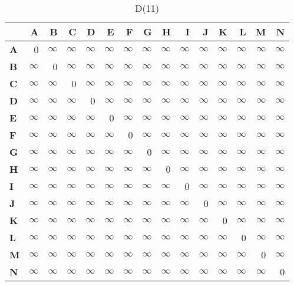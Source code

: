\documentclass{article}
\newcommand{\INF}{$\infty$}
\begin{document}
\begin{table}[H]\centering
\caption{D(11)}
\begin{tabular}{l r r r r r r r r r r r r r r}
\toprule
 & \textbf{A} & \textbf{B} & \textbf{C} & \textbf{D} & \textbf{E} & \textbf{F} & \textbf{G} & \textbf{H} & \textbf{I} & \textbf{J} & \textbf{K} & \textbf{L} & \textbf{M} & \textbf{N}\\\midrule
\textbf{A} & 0 & \INF & \INF & \INF & \INF & \INF & \INF & \INF & \INF & \INF & \INF & \INF & \INF & \INF \\
\textbf{B} & \INF & 0 & \INF & \INF & \INF & \INF & \INF & \INF & \INF & \INF & \INF & \INF & \INF & \INF \\
\textbf{C} & \INF & \INF & 0 & \INF & \INF & \INF & \INF & \INF & \INF & \INF & \INF & \INF & \INF & \INF \\
\textbf{D} & \INF & \INF & \INF & 0 & \INF & \INF & \INF & \INF & \INF & \INF & \INF & \INF & \INF & \INF \\
\textbf{E} & \INF & \INF & \INF & \INF & 0 & \INF & \INF & \INF & \INF & \INF & \INF & \INF & \INF & \INF \\
\textbf{F} & \INF & \INF & \INF & \INF & \INF & 0 & \INF & \INF & \INF & \INF & \INF & \INF & \INF & \INF \\
\textbf{G} & \INF & \INF & \INF & \INF & \INF & \INF & 0 & \INF & \INF & \INF & \INF & \INF & \INF & \INF \\
\textbf{H} & \INF & \INF & \INF & \INF & \INF & \INF & \INF & 0 & \INF & \INF & \INF & \INF & \INF & \INF \\
\textbf{I} & \INF & \INF & \INF & \INF & \INF & \INF & \INF & \INF & 0 & \INF & \INF & \INF & \INF & \INF \\
\textbf{J} & \INF & \INF & \INF & \INF & \INF & \INF & \INF & \INF & \INF & 0 & \INF & \INF & \INF & \INF \\
\textbf{K} & \INF & \INF & \INF & \INF & \INF & \INF & \INF & \INF & \INF & \INF & 0 & \INF & \INF & \INF \\
\textbf{L} & \INF & \INF & \INF & \INF & \INF & \INF & \INF & \INF & \INF & \INF & \INF & 0 & \INF & \INF \\
\textbf{M} & \INF & \INF & \INF & \INF & \INF & \INF & \INF & \INF & \INF & \INF & \INF & \INF & 0 & \INF \\
\textbf{N} & \INF & \INF & \INF & \INF & \INF & \INF & \INF & \INF & \INF & \INF & \INF & \INF & \INF & 0 \\
\bottomrule
\end{tabular}
\end{table}
\end{document}
